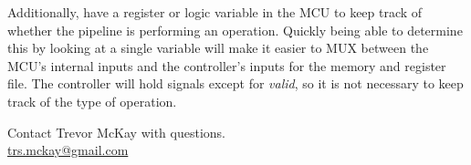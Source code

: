 \documentclass[10pt,a4paper]{article}
\begin{document}
Additionally, have a register or logic variable in the MCU to keep track of whether the pipeline
is performing an operation. Quickly being able to determine this by looking at a single variable 
will make it easier to MUX between the MCU's internal inputs and the controller's inputs for
the memory and register file. The controller will hold signals except for \emph{valid}, so it is not
necessary to keep track of the type of operation.

\vspace*{\fill}
\begin{center}
    \noindent Contact Trevor McKay with questions.\\
    \href{mailto:trs.mckay@gmail.com}{trs.mckay@gmail.com}
\end{center}
\end{document}
